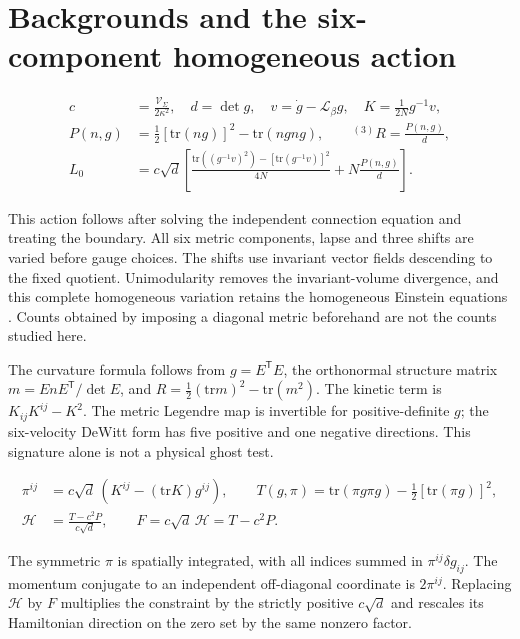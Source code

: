 \section{Backgrounds and the six-component homogeneous action}

\begin{equation}\tag{H-01}\label{eq:H-01}
\begin{aligned}c&=\frac{\mathcal V_{\Sigma}}{2\kappa^2},\quad d=\det g,\quad v=\dot g-\mathcal L_{\beta}g,\quad K=\frac1{2N}g^{-1}v,\\ P(n,g)&=\frac12[\mathrm{tr}(ng)]^2-\mathrm{tr}(ngng),\qquad {}^{(3)}R=\frac{P(n,g)}{d},\\ L_0&=c\sqrt d\left[\frac{\mathrm{tr}((g^{-1}v)^2)-[\mathrm{tr}(g^{-1}v)]^2}{4N}+N\frac{P(n,g)}d\right].\end{aligned}
\end{equation}

This action follows after solving the independent connection equation and treating the boundary. All six metric components, lapse and three shifts are varied before gauge choices. The shifts use invariant vector fields descending to the fixed quotient. Unimodularity removes the invariant-volume divergence, and this complete homogeneous variation retains the homogeneous Einstein equations \cite{Torre2004}. Counts obtained by imposing a diagonal metric beforehand are not the counts studied here.

The curvature formula follows from $g=E^{\mathsf T}E$, the orthonormal structure matrix $m=EnE^{\mathsf T}/\det E$, and $R=\tfrac12(\mathrm{tr}m)^2-\mathrm{tr}(m^2)$. The kinetic term is $K_{ij}K^{ij}-K^2$. The metric Legendre map is invertible for positive-definite $g$; the six-velocity DeWitt form has five positive and one negative directions. This signature alone is not a physical ghost test.

\begin{equation}\tag{H-02}\label{eq:H-02}
\begin{aligned}\pi^{ij}&=c\sqrt d\,(K^{ij}-(\mathrm{tr}K)g^{ij}),\qquad T(g,\pi)=\mathrm{tr}(\pi g\pi g)-\tfrac12[\mathrm{tr}(\pi g)]^2,\\ \mathcal H&=\frac{T-c^2P}{c\sqrt d},\qquad F=c\sqrt d\,\mathcal H=T-c^2P.\end{aligned}
\end{equation}

The symmetric $\pi$ is spatially integrated, with all indices summed in $\pi^{ij}\delta g_{ij}$. The momentum conjugate to an independent off-diagonal coordinate is $2\pi^{ij}$. Replacing $\mathcal H$ by $F$ multiplies the constraint by the strictly positive $c\sqrt d$ and rescales its Hamiltonian direction on the zero set by the same nonzero factor.

